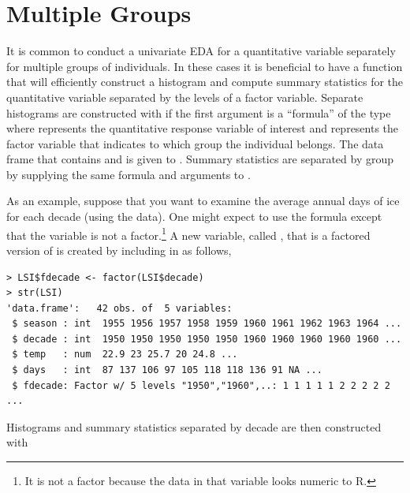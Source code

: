 \documentclass[10pt,openany]{book}\usepackage[]{graphicx}\usepackage[]{color}
\makeatletter
\newenvironment{kframe}{%
 \def\at@end@of@kframe{}%
 \ifinner\ifhmode%
  \def\at@end@of@kframe{\end{minipage}}%
  \begin{minipage}{\columnwidth}%
 \fi\fi%
 \def\FrameCommand##1{\hskip\@totalleftmargin \hskip-\fboxsep
 \colorbox{shadecolor}{##1}\hskip-\fboxsep
     \hskip-\linewidth \hskip-\@totalleftmargin \hskip\columnwidth}%
 \MakeFramed {\advance\hsize-\width
   \@totalleftmargin\z@ \linewidth\hsize
   \@setminipage}}%
 {\par\unskip\endMakeFramed%
 \at@end@of@kframe}
\newenvironment{knitrout}{}{} %
\makeatother
\begin{document}
\section{Multiple Groups} \label{sect:MultGroups}
It is common to conduct a univariate EDA for a quantitative variable separately for multiple groups of individuals.  In these cases it is beneficial to have a function that will efficiently construct a histogram and compute summary statistics for the quantitative variable separated by the levels of a factor variable.  Separate histograms are constructed with  if the first argument is a ``formula'' of the type  where  represents the quantitative response variable of interest and  represents the factor variable that indicates to which group the individual belongs.  The data frame that contains  and  is given to .  Summary statistics are separated by group by supplying the same formula and  arguments to .

As an example, suppose that you want to examine the average annual days of ice for each decade (using the  data).  One might expect to use the  formula except that the  variable is not a factor.\footnote{It is not a factor because the data in that variable looks numeric to R.}  A new variable, called , that is a factored version of  is created by including  in  as follows,
\begin{knitrout}
\color{fgcolor}\begin{kframe}
\begin{verbatim}
> LSI$fdecade <- factor(LSI$decade)
> str(LSI)
'data.frame':	42 obs. of  5 variables:
 $ season : int  1955 1956 1957 1958 1959 1960 1961 1962 1963 1964 ...
 $ decade : int  1950 1950 1950 1950 1950 1960 1960 1960 1960 1960 ...
 $ temp   : num  22.9 23 25.7 20 24.8 ...
 $ days   : int  87 137 106 97 105 118 118 136 91 NA ...
 $ fdecade: Factor w/ 5 levels "1950","1960",..: 1 1 1 1 1 2 2 2 2 2 ...
\end{verbatim}
\end{kframe}
\end{knitrout}

Histograms  and summary statistics separated by decade are then constructed with
\end{document}
